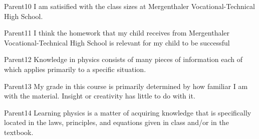 \begin{question}{Parent10}
    \QuestionIndicative
    I am satisified with the class sizes at 
        Mergenthaler Vocational-Technical High School.
    \begin{choiceshoriz}[o]
    \end{choiceshoriz}
\end{question}

\begin{question}{Parent11}
    \QuestionIndicative
    I think the homework that my child receives from
        Mergenthaler Vocational-Technical High School
        is relevant for my child to be successful
    \begin{choiceshoriz}[o]
    \end{choiceshoriz}
\end{question}

\begin{question}{Parent12}
    \QuestionIndicative
    Knowledge in physics consists of many pieces of information each of which
        applies primarily to a specific situation.
    \begin{choiceshoriz}[o]
    \end{choiceshoriz}
\end{question}

\begin{question}{Parent13}
    \QuestionIndicative
    My grade in this course is primarily determined by how familiar I am with
        the material.
    Insight or creativity has little to do with it.
    \begin{choiceshoriz}[o]
    \end{choiceshoriz}
\end{question}

\begin{question}{Parent14}
    \QuestionIndicative
    Learning physics is a matter of acquiring knowledge that is specifically
        located in the laws, principles, and equations given in class
        and/or in the textbook.
    \begin{choiceshoriz}[o]
    \end{choiceshoriz}
\end{question}

